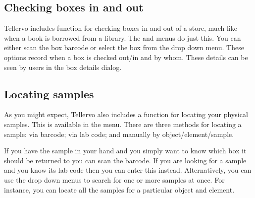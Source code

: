 \subsection{Checking boxes in and out}
Tellervo includes function for checking boxes in and out of a store, much like when a book is borrowed from a library.  The  and  menus do just this.  You can either scan the box barcode or select the box from the drop down menu.  These options record when a box is checked out/in and by whom.  These details can be seen by users in the box details dialog.

\subsection{Locating samples}
As you might expect, Tellervo also includes a function for locating your physical samples.  This is available in the  menu.  There are three methods for locating a sample: via barcode; via lab code; and manually by object/element/sample.  

If you have the sample in your hand and you simply want to know which box it should be returned to you can scan the barcode.  If you are looking for a sample and you know its lab code then you can enter this instead.  Alternatively, you can use the drop down menus to search for one or more samples at once.  For instance, you can locate all the samples for a particular object and element.


